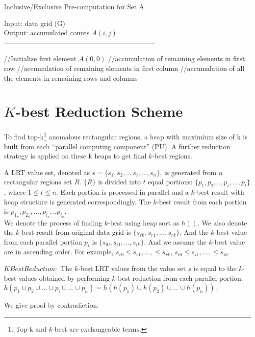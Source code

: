 \documentclass[AMA,LATO1COL]{WileyNJD-v2}
\begin{document}
\begin{algorithm}[t!]
\caption{Inclusive/Exclusive Pre-computation for Set A}\label{preinex}
Input: data grid (G) \\
Output: accumulated counts $A(i,j)$\\
------------------------------------------------------------------ \\
\begin{algorithmic}[1]
\State //Initialize first element $A(0,0)$
\State //accumulation of remaining elements in first row
\EndFor
\State //accumulation of remaining elements in first column
\EndFor
\State //accumulation of all the elements in remaining rows and columns
\EndFor
{}
\EndFor
\EndFor
\end{algorithmic}
\end{algorithm}
\section{ $K$-best Reduction Scheme}\label{KBEST}
To find top-k\footnote{Top-k and $k$-best are exchangeable terms.} anomalous rectangular regions, a heap with maximium size of k is built from each ``parallel computing component'' (PU). A further reduction strategy is applied on these k heaps to get final $k$-best regions.

A LRT value set, denoted as $s=\{s_1,s_2, .., s_i,...,s_n\}$, is generated from $n$ rectangular regions set ${R}$. $\{R\}$ is divided into $t$ equal portions: $\{p_1,p_2,..,p_i,...,p_t\}$, where $1\le t\le n$. Each portion is processed in parallel and a $k$-best result with heap structure is generated correspondingly. The $k$-best result from each portion is $p_{1_k},p_{2_k},...,p_{i_k},..p_{t_k}$.\\ We denote the process of finding $k$-best using heap sort as $h()$. We also denote the $k$-best result from original data grid is $\{s_{r0},s_{r1},...,s_{rk}\}$. And the $k$-best value from each parallel portion $p_i$ is $\{s_{i0},s_{i1},...,s_{ik}\}$. And we assume the $k$-best value are in ascending order. For example, $s_{r0}\le s_{r1},...,\le s_{rk}$, $s_{i0}\le s_{i1},...,\le s_{ik}$.
\begin{lemma}{\bf $KBestReduction:$} The $k$-best LRT values from the value set ${s}$ is equal to the $k$-best values obtained by performing $k$-best reduction from each parallel portion:
$h(p_1\cup p_2\cup ...\cup p_i \cup...\cup p_n)=h(h(p_1)\cup h(p_2)\cup ...\cup h(p_n))$.
\end{lemma}
We give proof by contradiction:
\end{document}

